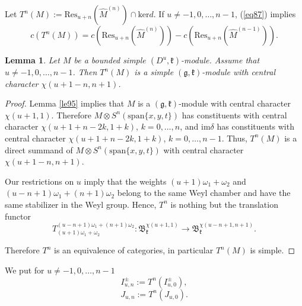 \documentclass[12pt]{amsart}
\theoremstyle{plain} %
\newtheorem{lemma}[definition]{Lemma}
\newcommand{\Ker}{\mathrm{ker}}
\newcommand{\im}{\mathrm{im }}
\newcommand{\res}{\mathrm{Res}}
\renewcommand{\span}{\mathrm{span}}
\newcommand{\kk}{\mathfrak{k}}
\renewcommand{\gg}{\mathfrak{g}}
\newcommand {\BB} {\mathfrak {B}}
\newcommand{\refle}[1]{Lemma \ref{#1}}
\newcommand{\refeq}[1]{(\ref{#1})}
\begin{document}
Let $T^n(M):=\res_{u+n}({\hat M}^{(n)})\cap \Ker d$. If $u\neq
-1,0,\dots,n-1$, \refeq{eq87} implies
\begin{equation}\label{eqcTnM}
c(T^n(M))=c(\res_{u+n}(\hat M^{(n)}))-c(\res_{u+n}(\hat M^{(n-1)})).
\end{equation}

\begin{lemma}\label{le811}
Let $M$ be a bounded simple $(D^u,\kk)$-module. Assume that $u\neq -1,0,\dots,n-1$. Then $T^n(M)$ is a simple $(\gg,\kk)$-module with central character $\chi(u+1-n,n+1)$.
\end{lemma}
\begin{proof}
\refle{le95} implies that $M$ is a $(\gg,\kk)$-module with central character $\chi(u+1,1)$. Therefore $M\otimes S^n(\span\{x,y,t\})$ has constituents with central character $\chi(u+1+n-2k,1+k)$, $k=0,\dots,n$, and $\im \delta$ has constituents with central character $\chi(u+1+n-2k,1+k)$, $k=0,\dots,n-1$. Thus, $T^n(M)$ is a direct summand of $M\otimes S^n(\span\{x,y,t\})$ with central character $\chi(u+1-n,n+1)$.

Our restrictions on $u$ imply that the weights $(u+1)\omega_1+\omega_2$ and $(u-n+1)\omega_1+(n+1)\omega_2$ belong to the same Weyl chamber and have the same stabilizer in the Weyl group. Hence, $T^n$ is nothing but the translation functor
\[
T_{(u+1)\omega_1+\omega_2}^{(u-n+1)\omega_1+(n+1)\omega_2}:\BB_\kk^{\chi(u+1,1)}\to\BB_\kk^{\chi(u-n+1,n+1)}.
\]
 

Therefore $T^n$ is an equivalence of categories, in particular $T^n(M)$ is simple.
\end{proof}

We put for $u\neq -1,0,\dots,n-1$
\[
I^\pm_{u,n}:=T^n(I^\pm_{u,0}),
\]
\[
J_{u,n}:=T^n(J_{u,0}).
\]
\end{document}

